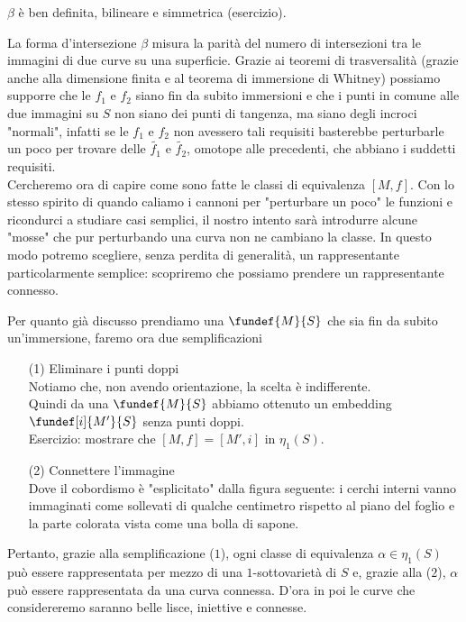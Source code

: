 \begin{oss}
	$\beta$ è ben definita, bilineare e simmetrica (esercizio).
\end{oss}

La forma d'intersezione $\beta$ misura la parità del numero di intersezioni tra le immagini di due curve su una superficie. Grazie ai teoremi di trasversalità (grazie anche alla dimensione finita e al teorema di immersione di Whitney) possiamo supporre che le $f_1$ e $f_2$ siano fin da subito immersioni e che i punti in comune alle due immagini su $S$ non siano dei punti di tangenza, ma siano degli incroci "normali", infatti se le $f_1$ e $f_2$ non avessero tali requisiti basterebbe perturbarle un poco per trovare delle $\tilde{f_1}$ e $\tilde{f_2}$, omotope alle precedenti, che abbiano i suddetti requisiti. \\

Cercheremo ora di capire come sono fatte le classi di equivalenza $[M,f]$. Con lo stesso spirito di quando caliamo i cannoni per "perturbare un poco" le funzioni e ricondurci a studiare casi semplici, il nostro intento sarà introdurre alcune "mosse" che pur perturbando una curva non ne cambiano la classe. In questo modo potremo scegliere, senza perdita di generalità, un rappresentante particolarmente semplice: scopriremo che possiamo prendere un rappresentante connesso.

Per quanto già discusso prendiamo una $\fundef{M}{S}$ che sia fin da subito un'immersione, faremo ora due semplificazioni

\begin{itemize}
\item[(1)] Eliminare i punti doppi \\
Notiamo che, non avendo orientazione, la scelta è indifferente. \\
Quindi da una $\fundef{M}{S}$ abbiamo ottenuto un embedding $\fundef[i]{M'}{S}$ senza punti doppi. \\
Esercizio: mostrare che $[M,f] = [M',i]$ in $\eta_1(S)$.

\item[(2)] Connettere l'immagine \\
Dove il cobordismo è "esplicitato" dalla figura seguente: i cerchi interni vanno immaginati come sollevati di qualche centimetro rispetto al piano del foglio e la parte colorata vista come una bolla di sapone.
\end{itemize}

Pertanto, grazie alla semplificazione ($1$), ogni classe di equivalenza  $\alpha \in \eta_1(S)$ può essere rappresentata per mezzo di una $1$-sottovarietà di $S$ e, grazie alla ($2$), $\alpha$ può essere rappresentata da una curva connessa. D'ora in poi le curve che considereremo saranno belle lisce, iniettive e connesse.

